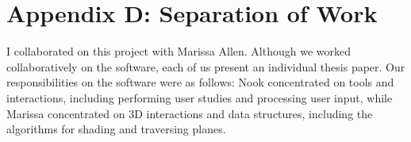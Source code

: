\section{Appendix D: Separation of
Work}\label{appendix-d-separation-of-work}

I collaborated on this project with Marissa Allen. Although we worked
collaboratively on the software, each of us present an individual thesis
paper. Our responsibilities on the software were as follows: Nook
concentrated on tools and interactions, including performing user
studies and processing user input, while Marissa concentrated on 3D
interactions and data structures, including the algorithms for shading
and traversing planes.
